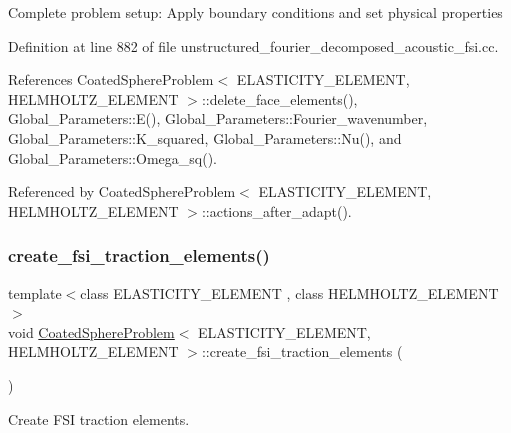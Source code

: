 Complete problem setup\+: Apply boundary conditions and set physical properties 

Definition at line 882 of file unstructured\+\_\+fourier\+\_\+decomposed\+\_\+acoustic\+\_\+fsi.\+cc.



References Coated\+Sphere\+Problem$<$ E\+L\+A\+S\+T\+I\+C\+I\+T\+Y\+\_\+\+E\+L\+E\+M\+E\+N\+T, H\+E\+L\+M\+H\+O\+L\+T\+Z\+\_\+\+E\+L\+E\+M\+E\+N\+T $>$\+::delete\+\_\+face\+\_\+elements(), Global\+\_\+\+Parameters\+::\+E(), Global\+\_\+\+Parameters\+::\+Fourier\+\_\+wavenumber, Global\+\_\+\+Parameters\+::\+K\+\_\+squared, Global\+\_\+\+Parameters\+::\+Nu(), and Global\+\_\+\+Parameters\+::\+Omega\+\_\+sq().



Referenced by Coated\+Sphere\+Problem$<$ E\+L\+A\+S\+T\+I\+C\+I\+T\+Y\+\_\+\+E\+L\+E\+M\+E\+N\+T, H\+E\+L\+M\+H\+O\+L\+T\+Z\+\_\+\+E\+L\+E\+M\+E\+N\+T $>$\+::actions\+\_\+after\+\_\+adapt().

\mbox{\label{classCoatedSphereProblem_a2d342158b3058cd5392e2de3fd7595da}} 
\subsubsection{\texorpdfstring{create\+\_\+fsi\+\_\+traction\+\_\+elements()}{create\_fsi\_traction\_elements()}\hspace{0.1cm}{\footnotesize\ttfamily [1/2]}}
{\footnotesize\ttfamily template$<$class E\+L\+A\+S\+T\+I\+C\+I\+T\+Y\+\_\+\+E\+L\+E\+M\+E\+NT , class H\+E\+L\+M\+H\+O\+L\+T\+Z\+\_\+\+E\+L\+E\+M\+E\+NT $>$ \\
void \hyperlink{classCoatedSphereProblem}{Coated\+Sphere\+Problem}$<$ E\+L\+A\+S\+T\+I\+C\+I\+T\+Y\+\_\+\+E\+L\+E\+M\+E\+NT, H\+E\+L\+M\+H\+O\+L\+T\+Z\+\_\+\+E\+L\+E\+M\+E\+NT $>$\+::create\+\_\+fsi\+\_\+traction\+\_\+elements (\begin{DoxyParamCaption}{ }\end{DoxyParamCaption})\hspace{0.3cm}{\ttfamily [private]}}



Create F\+SI traction elements. 

